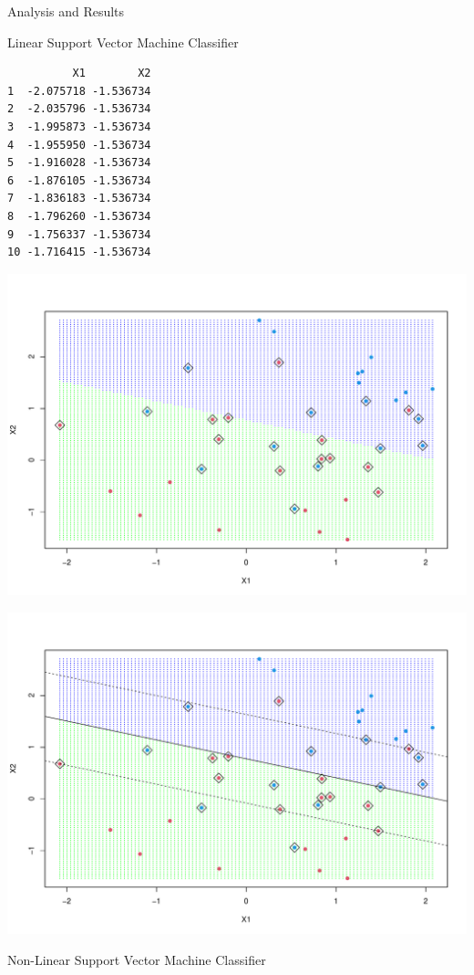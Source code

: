 \documentclass[
  ignorenonframetext,
]{beamer}
\begin{document}
\begin{frame}[fragile]{Analysis and Results}
\begin{block}{Linear Support Vector Machine Classifier}
\begin{verbatim}
          X1        X2
1  -2.075718 -1.536734
2  -2.035796 -1.536734
3  -1.995873 -1.536734
4  -1.955950 -1.536734
5  -1.916028 -1.536734
6  -1.876105 -1.536734
7  -1.836183 -1.536734
8  -1.796260 -1.536734
9  -1.756337 -1.536734
10 -1.716415 -1.536734
\end{verbatim}

\includegraphics{slides_files/figure-beamer/unnamed-chunk-1-3.pdf}

\includegraphics{slides_files/figure-beamer/unnamed-chunk-1-4.pdf}
\end{block}

\begin{block}{Non-Linear Support Vector Machine Classifier}
\protect\hypertarget{non-linear-support-vector-machine-classifier}{}
\end{block}
\end{frame}
\end{document}
